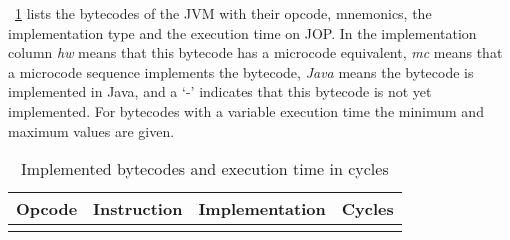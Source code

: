 %

\tablename~\ref{tab:appendix:bytecode} lists the bytecodes of the
JVM with their opcode, mnemonics, the implementation type and the
execution time on JOP. In the implementation column \emph{hw} means
that this bytecode has a microcode equivalent, \emph{mc} means that
a microcode sequence implements the bytecode, \emph{Java} means the
bytecode is implemented in Java, and a `-' indicates that this
bytecode is not yet implemented. For bytecodes with a variable
execution time the minimum and maximum values are given.

\begin{longtable}{rllr}
    \toprule
    Opcode & Instruction & Implementation & Cycles \\
    \midrule
    \endhead
    \bottomrule
    \caption{Implemented bytecodes and execution time in cycles}
    \label{tab:appendix:bytecode}
    \endfoot
    
\end{longtable}









